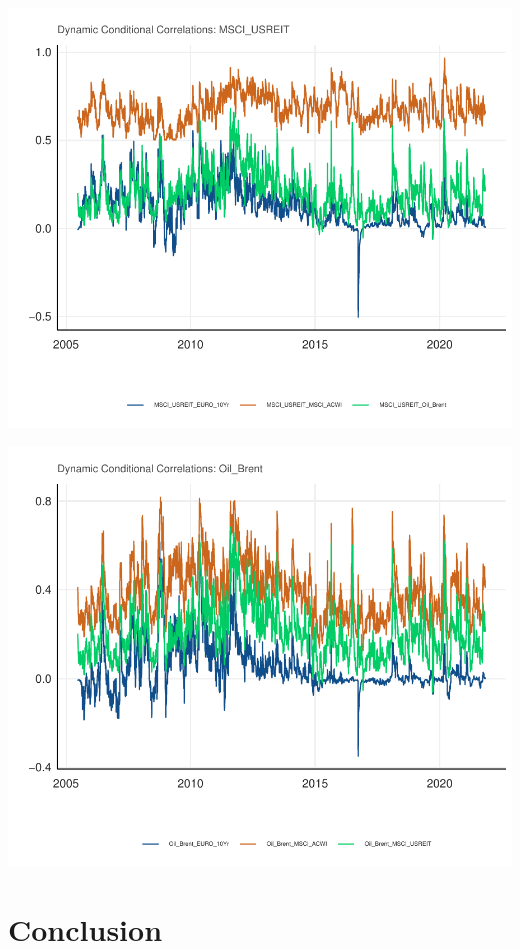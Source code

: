 \documentclass[11pt,preprint, authoryear]{elsarticle}
\numberwithin{equation}{section}
\numberwithin{figure}{section}
\numberwithin{table}{section}
\begin{document}
\includegraphics{Question6_files/figure-latex/unnamed-chunk-16-1.pdf}

\includegraphics{Question6_files/figure-latex/unnamed-chunk-17-1.pdf}

\hypertarget{conclusion}{%
\section{Conclusion}\label{conclusion}}


\end{document}
